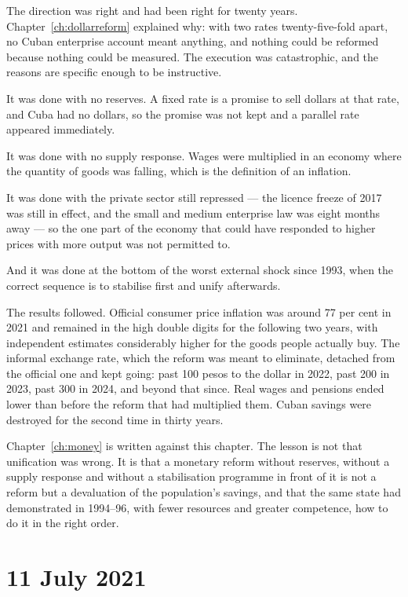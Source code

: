 The direction was right and had been right for twenty years. Chapter~\ref{ch:dollarreform}
explained why: with two rates twenty-five-fold apart, no Cuban enterprise
account meant anything, and nothing could be reformed because nothing could be
measured. The execution was catastrophic, and the reasons are specific enough to
be instructive.

It was done with no reserves. A fixed rate is a promise to sell dollars at that
rate, and Cuba had no dollars, so the promise was not kept and a parallel rate
appeared immediately.

It was done with no supply response. Wages were multiplied in an economy where
the quantity of goods was falling, which is the definition of an inflation.

It was done with the private sector still repressed --- the licence freeze of
2017 was still in effect, and the small and medium enterprise law was eight
months away --- so the one part of the economy that could have responded to
higher prices with more output was not permitted to.

And it was done at the bottom of the worst external shock since 1993, when the
correct sequence is to stabilise first and unify afterwards.

The results followed. Official consumer price inflation was around 77 per cent
in 2021 and remained in the high double digits for the following two years,
with independent estimates considerably higher for the goods people actually
buy.\unv{} The informal exchange rate, which the reform was meant to eliminate,
detached from the official one and kept going: past 100 pesos to the dollar in
2022, past 200 in 2023, past 300 in 2024, and beyond that since.\unv{} Real
wages and pensions ended lower than before the reform that had multiplied them.
Cuban savings were destroyed for the second time in thirty years.

Chapter~\ref{ch:money} is written against this chapter. The lesson is not that
unification was wrong. It is that a monetary reform without reserves, without a
supply response and without a stabilisation programme in front of it is not a
reform but a devaluation of the population's savings, and that the same state
had demonstrated in 1994--96, with fewer resources and greater competence, how
to do it in the right order.

\section{11 July 2021}

